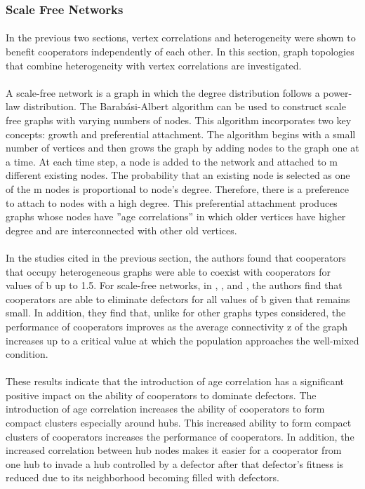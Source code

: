 \documentclass{article}
\begin{document}
	\subsubsection{Scale Free Networks}
	\paragraph{}In the previous two sections, vertex correlations and heterogeneity were shown to benefit cooperators independently of each other.  In this section, graph topologies that combine heterogeneity with vertex correlations are investigated.
	\paragraph{}A scale-free network is a graph in which the degree distribution follows a power-law distribution.  The Barabási-Albert algorithm can be used to construct scale free graphs with varying numbers of nodes.  This algorithm incorporates two key concepts: growth and preferential attachment.  The algorithm begins with a small number of vertices and then grows the graph by adding nodes to the graph one at a time.  At each time step, a node is added to the network and attached to m different existing nodes.  The probability that an existing node is selected as one of the m nodes is proportional to node’s degree.  Therefore, there is a preference to attach to nodes with a high degree.  This preferential attachment produces graphs whose nodes have ”age correlations” in which older vertices have higher degree and are interconnected with other old vertices.
	\paragraph{}In the studies cited in the previous section, the authors found that cooperators that occupy heterogeneous graphs were able to coexist with cooperators for values of b up to 1.5.  For scale-free networks, in \cite{Pacheco2005}, \cite{Santos2006a}, \cite{Santos2006b} and \cite{Santos2006c}, the authors find that cooperators are able to eliminate defectors for all values of b given that  remains small.  In addition, they find that, unlike for other graphs types considered, the performance of cooperators improves as the average connectivity z of the graph increases up to a critical value at which the population approaches the well-mixed condition.
	\paragraph{}These results indicate that the introduction of age correlation has a significant positive impact on the ability of cooperators to dominate defectors.  The introduction of age correlation increases the ability of cooperators to form compact clusters especially around hubs.  This increased ability to form compact clusters of cooperators increases the performance of cooperators.  In addition, the increased correlation between hub nodes makes it easier for a cooperator from one hub to invade a hub controlled by a defector after that defector’s fitness is reduced due to its neighborhood becoming filled with defectors.
\end{document}
